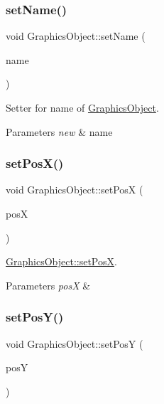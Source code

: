 \subsubsection{\texorpdfstring{set\+Name()}{setName()}}
{\footnotesize\ttfamily void Graphics\+Object\+::set\+Name (\begin{DoxyParamCaption}\item[{const Q\+String \&}]{name }\end{DoxyParamCaption})}



Setter for name of \hyperlink{class_graphics_object}{Graphics\+Object}. 


\begin{DoxyParams}{Parameters}
{\em new} & name \\
\hline
\end{DoxyParams}
\mbox{\label{class_graphics_object_ac355db089d870d194e5961921d5626e3}} 
\subsubsection{\texorpdfstring{set\+Pos\+X()}{setPosX()}}
{\footnotesize\ttfamily void Graphics\+Object\+::set\+PosX (\begin{DoxyParamCaption}\item[{const qreal \&}]{posX }\end{DoxyParamCaption})}



\hyperlink{class_graphics_object_ac355db089d870d194e5961921d5626e3}{Graphics\+Object\+::set\+PosX}. 


\begin{DoxyParams}{Parameters}
{\em posX} & \\
\hline
\end{DoxyParams}
\mbox{\label{class_graphics_object_ab450d85cfafd5eb80c2ce75784e13088}} 
\subsubsection{\texorpdfstring{set\+Pos\+Y()}{setPosY()}}
{\footnotesize\ttfamily void Graphics\+Object\+::set\+PosY (\begin{DoxyParamCaption}\item[{const qreal \&}]{posY }\end{DoxyParamCaption})}




